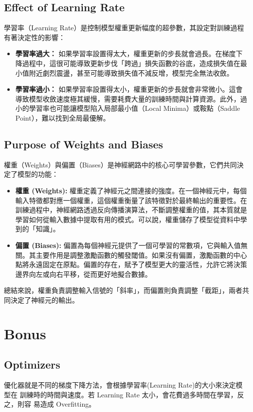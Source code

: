 \documentclass{article}
\begin{document}
\subsection{Effect of Learning Rate}
學習率（Learning Rate）是控制模型權重更新幅度的超參數，其設定對訓練過程有著決定性的影響：
\begin{itemize}
    \item \textbf{學習率過大：} 如果學習率設置得太大，權重更新的步長就會過長。在梯度下降過程中，這很可能導致更新步伐「跨過」損失函數的谷底，造成損失值在最小值附近劇烈震盪，甚至可能導致損失值不減反增，模型完全無法收斂。
    \item \textbf{學習率過小：} 如果學習率設置得太小，權重更新的步長就會非常微小。這會導致模型收斂速度極其緩慢，需要耗費大量的訓練時間與計算資源。此外，過小的學習率也可能讓模型陷入局部最小值（Local Minima）或鞍點（Saddle Point），難以找到全局最優解。
\end{itemize}


\subsection{Purpose of Weights and Biases}
權重（Weights）與偏置（Biases）是神經網路中的核心可學習參數，它們共同決定了模型的功能：
\begin{itemize}
    \item \textbf{權重 (Weights):} 權重定義了神經元之間連接的強度。在一個神經元中，每個輸入特徵都對應一個權重，這個權重衡量了該特徵對於最終輸出的重要性。在訓練過程中，神經網路透過反向傳播演算法，不斷調整權重的值，其本質就是學習如何從輸入數據中提取有用的模式。可以說，權重儲存了模型從資料中學到的「知識」。
    \item \textbf{偏置 (Biases):} 偏置為每個神經元提供了一個可學習的常數項，它與輸入值無關。其主要作用是調整激勵函數的觸發閾值。如果沒有偏置，激勵函數的中心點將永遠固定在原點。偏置的存在，賦予了模型更大的靈活性，允許它將決策邊界向左或向右平移，從而更好地擬合數據。
\end{itemize}
總結來說，權重負責調整輸入信號的「斜率」，而偏置則負責調整「截距」，兩者共同決定了神經元的輸出。

\section{Bonus}

\subsection{Optimizers}
優化器就是不同的梯度下降方法，會根據學習率(Learning Rate)的大小來決定模型在
訓練時的時間與速度。若 Learning Rate 太小，會花費過多時間在學習，反之，則容  
易造成 Overfitting。
\end{document}
